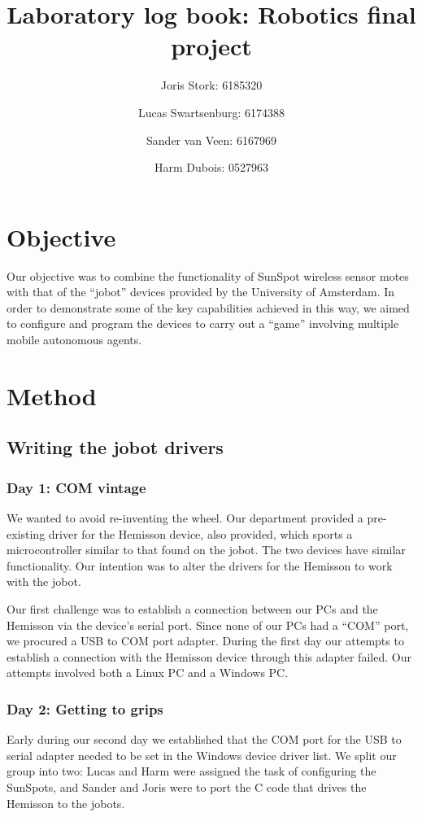 \documentclass[a4paper, 12pt, titlepage]{article}
\author{Joris Stork: 6185320 \and Lucas Swartsenburg: 6174388 \and Sander van
Veen: 6167969 \and Harm Dubois: 0527963}
\title{Laboratory log book: Robotics final project}
\begin{document}
\maketitle

\section{Objective} %

Our objective was to combine the functionality of SunSpot wireless sensor
motes with that of the ``jobot'' devices provided by the University of
Amsterdam. In order to demonstrate some of the key capabilities achieved in this
way, we aimed to configure and program the devices to carry out a ``game''
involving multiple mobile autonomous agents.


\section{Method} %

\subsection{Writing the jobot drivers} %

\subsubsection{Day 1: COM vintage} %

We wanted to avoid re-inventing the wheel. Our department provided a
pre-existing driver for the Hemisson device, also provided, which sports a
microcontroller similar to that found on the jobot. The two devices have similar
functionality. Our intention was to alter the drivers for the Hemisson to work
with the jobot.

Our first challenge was to establish a connection between our PCs and the
Hemisson via the device's serial port. Since none of our PCs had a ``COM'' port,
we procured a USB to COM port adapter. During the first day our attempts to
establish a connection with the Hemisson device through this adapter failed. Our
attempts involved both a Linux PC and a Windows PC.


\subsubsection{Day 2: Getting to grips} %
Early during our second day we established that the COM port for the USB to
serial adapter needed to be set in the Windows device driver list. We split our
group into two: Lucas and Harm were assigned the task of configuring the
SunSpots, and Sander and Joris were to port the C code that drives the Hemisson
to the jobots. 
\end{document}

